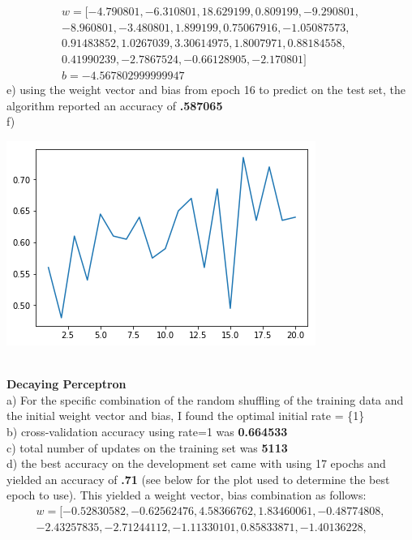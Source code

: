 \documentclass[11pt,a4paper]{article}
\begin{document}
\begin{enumerate}
			\begin{gather}
				w = [-4.790801  , -6.310801  , 18.629199  ,  0.809199  , -9.290801,\\
				-8.960801  , -3.480801  ,  1.899199  ,  0.75067916, -1.05087573,\\
				0.91483852,  1.0267039 ,  3.30614975,  1.8007971 ,  0.88184558,\\
				0.41990239, -2.7867524 , -0.66128905, -2.170801  ] \\
				b = -4.567802999999947
			\end{gather}
			e) using the weight vector and bias from epoch 16 to predict on the test set, the algorithm reported an accuracy of \textbf{.587065} \\
			f)
			\begin{center}
				\includegraphics[width=0.7\linewidth]{simple_plot}
			\end{center}
			~\\
			\textbf{Decaying Perceptron}    \\
			a) For the specific combination of the random shuffling of the training data and the initial weight vector and bias, I found the optimal initial rate = \{1\}  \\
			b) cross-validation accuracy using rate=1 was \textbf{0.664533}\\
			c) total number of updates on the training set was \textbf{5113}\\
			d) the best accuracy on the development set came with using 17 epochs and yielded an accuracy of \textbf{.71} (see below for the plot used to determine the best epoch to use). This yielded a weight vector, bias combination as follows:\\
			\begin{gather}
			w = [-0.52830582, -0.62562476,  4.58366762,  1.83460061, -0.48774808,\\
			-2.43257835, -2.71244112, -1.11330101,  0.85833871, -1.40136228,\\

\end{gather}
\end{enumerate}
\end{document}
